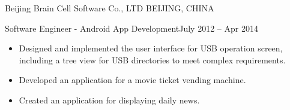 \documentclass[10pt,a4paper]{article}
\begin{document}
\vspace{0.2em}
  \headedsection
  {Beijing Brain Cell Software Co., LTD}
  {\textsc{BEIJING, CHINA}}
  {
    \headedsubsection
    {Software Engineer - Android App Development}{July 2012 -- Apr 2014}
    {\vspace{0.1em}
      \begin{itemize}
        \setlength{\itemsep}{0.3em}
        \item Designed and implemented the user interface for USB operation screen, including a tree view for USB directories to meet complex requirements.
        \item Developed an application for a movie ticket vending machine.
        \item Created an application for displaying daily news.





      \end{itemize}
    }
  }

\end{document}
